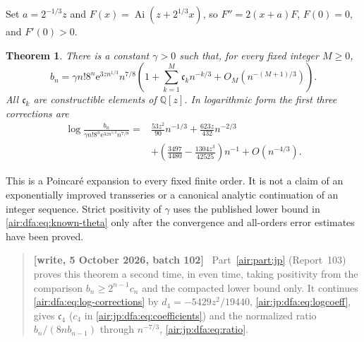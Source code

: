 \documentclass[11pt,letterpaper]{article}
\numberwithin{equation}{section}
\newtheorem{theorem}{Theorem}[section]
\theoremstyle{remark}
\newcommand{\Ai}{\operatorname{Ai}}
\newcommand{\Q}{\mathbb{Q}}
\newcommand{\ee}{\mathrm e}
\newenvironment{writenotejp}{\par\smallskip\begin{quote}\small\textbf{[write, 5 October 2026, batch 102]}\ }{\end{quote}\smallskip}
\begin{document}
Set $a=2^{-1/3}z$ and $F(x)=\Ai(z+2^{1/3}x)$, so
$F''=2(x+a)F$, $F(0)=0$, and $F'(0)>0$.
\begin{theorem}\label{air:dfa:thm:main}
There is a constant $\gamma>0$ such that, for every fixed integer $M\ge0$,
\begin{equation}\label{air:dfa:eq:main}
b_n=\gamma n!8^n\ee^{3zn^{1/3}}n^{7/8}
\left(1+\sum_{k=1}^{M}\mathfrak c_k n^{-k/3}
+O_M(n^{-(M+1)/3})\right).
\end{equation}
All $\mathfrak c_k$ are constructible elements of $\Q[z]$. In logarithmic
form the first three corrections are
\begin{equation}\label{air:dfa:eq:log-corrections}
\begin{aligned}
\log\frac{b_n}{\gamma n!8^n\ee^{3zn^{1/3}}n^{7/8}}
={}&\frac{53z^2}{90}n^{-1/3}+\frac{623z}{432}n^{-2/3}\\
&+\left(\frac{3497}{4480}-\frac{1304z^3}{42525}\right)n^{-1}
+O(n^{-4/3}).
\end{aligned}
\end{equation}
\end{theorem}
This is a Poincar\'e expansion to every fixed finite order. It is not a
claim of an exponentially improved transseries or a canonical analytic
continuation of an integer sequence. Strict positivity of $\gamma$ uses
the published lower bound in \eqref{air:dfa:eq:known-theta} only after the
convergence and all-orders error estimates have been proved.
\begin{writenotejp}
Part~\ref{air:part:jp} (Report~103) proves this theorem a second time, in even time, taking positivity from the comparison $b_n\ge2^{n-1}c_n$ and the compacted lower bound only. It continues \eqref{air:dfa:eq:log-corrections} by $d_4=-5429z^2/19440$, \eqref{air:jp:dfa:eq:logcoeff}, gives $\mathfrak c_4$ ($c_4$ in \eqref{air:jp:dfa:eq:coefficients}) and the normalized ratio $b_n/(8nb_{n-1})$ through $n^{-7/3}$, \eqref{air:jp:dfa:eq:ratio}.
\end{writenotejp}
\end{document}
